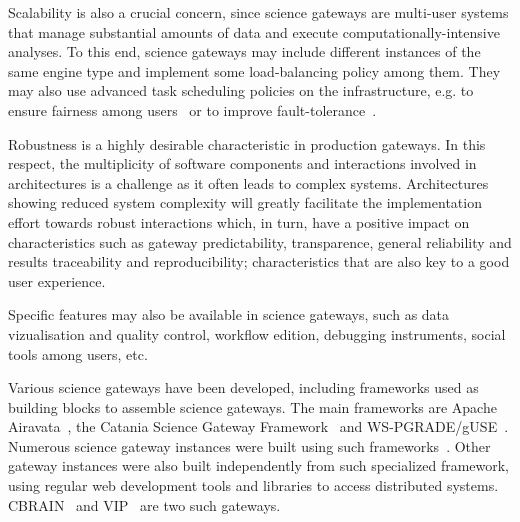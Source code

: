 \documentclass[preprint,3p,twocolumn]{elsarticle}
\newcommand{\note}[2]{\pdfmargincomment[color=yellow,author=#1,open=true]{#2}}
\newcommand{\closednote}[4]{} %
\begin{document}
Scalability is also a crucial concern, since science gateways are
multi-user systems that manage substantial amounts of data and execute
computationally-intensive analyses. To this end, science gateways
may include different instances of the same engine type and implement
some load-balancing policy among them. They may also use advanced
task scheduling policies on the infrastructure, e.g. to ensure fairness
among users~\cite{FERR-14,CPE:CPE3708} or to improve
fault-tolerance~\cite{wilkins2008teragrid,FERR-13}.

Robustness is a highly desirable characteristic in production gateways. In this respect, the
multiplicity of software components and interactions involved in architectures is
a challenge as it often leads to complex systems.
Architectures showing reduced system complexity will greatly
facilitate the implementation effort towards robust interactions
which, in turn, have a positive impact on characteristics such as
gateway predictability, transparence, general reliability and results
traceability and reproducibility; characteristics that are also key to
a good user experience. \closednote{Marc-Etienne}{I find that
  something is weak in this last paragraph. Robustness will help with
  transparency, sure, but it seems only a small facet.  Also, the text
  seem to timidly favor architectures with less
  components/interactions without much explanation... Complex systems
  can be robust, but at greater costs...  Here is one: "Architectures
  showing reduced system complexity will greatly facilitate the
  implementation effort towards robust interactions which, in turn,
  have a positive impact on characteristics such as gateway
  predictability, transparence, general reliability and results
  traceability and reproducibility; characteristics that are also key
  to a good user experience."}{Tristan}{Agreed, fixed as suggested.}

Specific features may also be available in science gateways, such as
data vizualisation and quality control, workflow edition, debugging
instruments, social tools among users, etc.

Various science gateways have been developed, including frameworks
used as building blocks to assemble science gateways. The main
frameworks are Apache Airavata~\cite{marru2011apache}, the Catania
Science Gateway Framework~\cite{Ardizzone2012} and
WS-PGRADE/gUSE~\cite{Kacsuk2012}. Numerous science gateway instances
were built using such
frameworks~\cite{kacsuk2014science,ardizzone2012decide}. Other gateway
instances were also built independently from such specialized
framework, using regular web development tools and libraries to access
distributed systems. CBRAIN~\cite{SHER-14} and VIP~\cite{GLAT-13} are
two such gateways.
\end{document}
